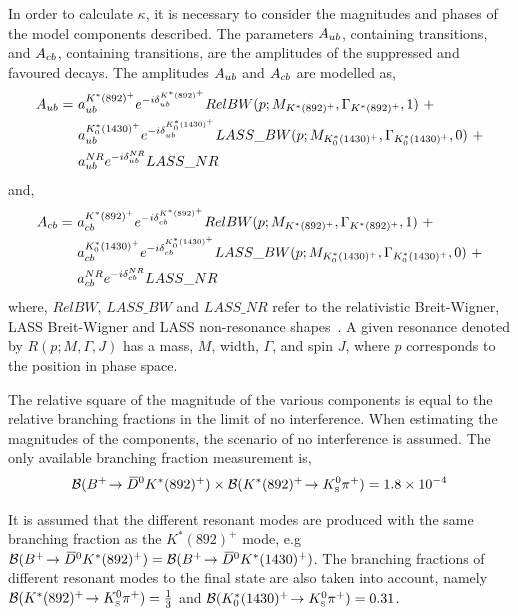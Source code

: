 In order to calculate $\kappa$, it is necessary to consider the magnitudes and phases of the model components described. The parameters $A_{{u}{b}}$, containing \decay{\bquark}{\uquark} transitions, and $A_{{c}{b}}$, containing \decay{\bquark}{\cquark} transitions, are the amplitudes of the suppressed and favoured  decays. The amplitudes $A_{{u}{b}}$ and $A_{{c}{b}}$ are modelled as,
\begin{align*}
A_{\uquark\bquark} =\ & a_{\uquark\bquark}^{K^*(892)^+}e^{-i\delta_{\uquark\bquark}^{K^*(892)^+}}RelBW(p;M_{K^*(892)^+},\Gamma_{K^*(892)^+},1)\ + \\
& a_{\uquark\bquark}^{K^*_0(1430)^+}e^{-i\delta_{\uquark\bquark}^{K^*_0(1430)^+}}LASS\_BW(p;M_{K^*_0(1430)^+},\Gamma_{K^*_0(1430)^+},0)\ + \\
& a_{\uquark\bquark}^{NR}e^{-i\delta_{\uquark\bquark}^{NR}}LASS\_NR
\end{align*}
and,
\begin{align*}
A_{\cquark\bquark} =\ & a_{\cquark\bquark}^{K^*(892)^+}e^{-i\delta_{\cquark\bquark}^{K^*(892)^+}}RelBW(p;M_{K^*(892)^+},\Gamma_{K^*(892)^+},1)\ + \\
& a_{\cquark\bquark}^{K^*_0(1430)^+}e^{-i\delta_{\cquark\bquark}^{K^*_0(1430)^+}}LASS\_BW(p;M_{K^*_0(1430)^+},\Gamma_{K^*_0(1430)^+},0)\ + \\
& a_{\cquark\bquark}^{NR}e^{-i\delta_{\cquark\bquark}^{NR}}LASS\_NR
\end{align*}
where, $RelBW$, $LASS\_BW$ and $LASS\_NR$ refer to the relativistic Breit-Wigner, LASS Breit-Wigner and LASS non-resonance shapes~\cite{LASS}. A given resonance denoted by $R(p;M,\Gamma,J)$ has a mass, $M$, width, $\Gamma$, and spin $J$, where $p$ corresponds to the position in \decay{\Bm}{\D\KS\pim} phase space.%

The relative square of the magnitude of the various components is equal to the relative branching fractions in the limit of no interference. When estimating the magnitudes of the components, the scenario of no interference is assumed. The only available branching fraction measurement is,
\begin{equation*}
{\ensuremath{\mathcal{B}}}({{{B}^+}}\!\rightarrow {\ensuremath{{\kern 0.2em\overline{\kern -0.2em D}{}}{}^0}} K^*(892)^+) \times {\ensuremath{\mathcal{B}}}(K^*(892)^+\!\rightarrow {\ensuremath{{K}^0_{\mathrm{ \scriptscriptstyle S}}}}{\ensuremath{{\pi}^+}}) = 1.8 \times 10^{-4}
\end{equation*}

It is assumed that the different resonant \Kstarp modes are produced with the same branching fraction as the $K^*(892)^+$ mode, e.g ${\mathcal{B}}({{{B}^+}}\!\rightarrow {\ensuremath{{\kern 0.2em\overline{\kern -0.2em D}{}}{}^0}} K^*(892)^+) = {\mathcal{B}}({{{B}^+}}\!\rightarrow {\ensuremath{{\kern 0.2em\overline{\kern -0.2em D}{}}{}^0}} K^*(1430)^+)$. The branching fractions of different resonant \Kstarp modes to the \KS\pip final state are also taken into account, namely ${\mathcal{B}}(K^*(892)^+\!\rightarrow {\ensuremath{{K}^0_{\mathrm{ \scriptscriptstyle S}}}}{\ensuremath{{\pi}^+}}) = \frac{1}{3}$ and ${\mathcal{B}}(K^*_0(1430)^+\!\rightarrow {\ensuremath{{K}^0_{\mathrm{ \scriptscriptstyle S}}}}{\ensuremath{{\pi}^+}}) = 0.31$.

